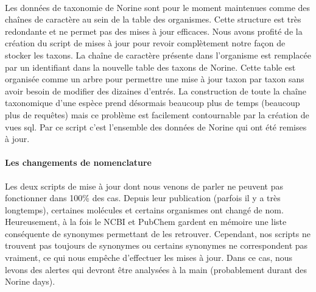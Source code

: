 \documentclass[12pt,french,twoside]{report}
\begin{document}
\paragraph{}Les données de taxonomie de Norine sont pour le moment maintenues comme des chaînes de caractère au sein de la table des organismes.
Cette structure est très redondante et ne permet pas des mises à jour efficaces.
Nous avons profité de la création du script de mises à jour pour revoir complètement notre façon de stocker les taxons.
La chaîne de caractère présente dans l'organisme est remplacée par un identifiant dans la nouvelle table des taxons de Norine.
Cette table est organisée comme un arbre pour permettre une mise à jour taxon par taxon sans avoir besoin de modifier des dizaines d'entrés.
La construction de toute la chaîne taxonomique d'une espèce prend désormais beaucoup plus de temps (beaucoup plus de requêtes) mais ce problème est facilement contournable par la création de vues sql.
Par ce script c'est l'ensemble des données de Norine qui ont été remises à jour.


\paragraph{Les changements de nomenclature}
Les deux scripts de mise à jour dont nous venons de parler ne peuvent pas fonctionner dans 100\% des cas.
Depuis leur publication (parfois il y a très longtemps), certaines molécules et certains organismes ont changé de nom.
Heureusement, à la fois le NCBI et PubChem gardent en mémoire une liste conséquente de synonymes permettant de les retrouver.
Cependant, nos scripts ne trouvent pas toujours de synonymes ou certains synonymes ne correspondent pas vraiment, ce qui nous empêche d'effectuer les mises à jour.
Dans ce cas, nous levons des alertes qui devront être analysées à la main (probablement durant des Norine days).
\end{document}
